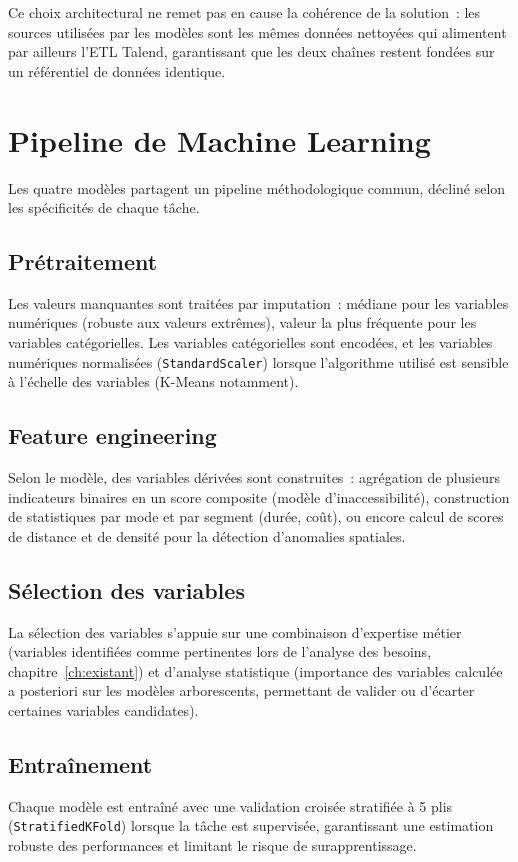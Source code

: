 Ce choix architectural ne remet pas en cause la cohérence de la solution~: les sources utilisées par les modèles sont les mêmes données nettoyées qui alimentent par ailleurs l'ETL Talend, garantissant que les deux chaînes restent fondées sur un référentiel de données identique.

\section{Pipeline de Machine Learning}
Les quatre modèles partagent un pipeline méthodologique commun, décliné selon les spécificités de chaque tâche.

\subsection{Prétraitement}
Les valeurs manquantes sont traitées par imputation~: médiane pour les variables numériques (robuste aux valeurs extrêmes), valeur la plus fréquente pour les variables catégorielles. Les variables catégorielles sont encodées, et les variables numériques normalisées (\texttt{StandardScaler}) lorsque l'algorithme utilisé est sensible à l'échelle des variables (K-Means notamment).

\subsection{Feature engineering}
Selon le modèle, des variables dérivées sont construites~: agrégation de plusieurs indicateurs binaires en un score composite (modèle d'inaccessibilité), construction de statistiques par mode et par segment (durée, coût), ou encore calcul de scores de distance et de densité pour la détection d'anomalies spatiales.

\subsection{Sélection des variables}
La sélection des variables s'appuie sur une combinaison d'expertise métier (variables identifiées comme pertinentes lors de l'analyse des besoins, chapitre~\ref{ch:existant}) et d'analyse statistique (importance des variables calculée a posteriori sur les modèles arborescents, permettant de valider ou d'écarter certaines variables candidates).

\subsection{Entraînement}
Chaque modèle est entraîné avec une validation croisée stratifiée à 5 plis (\texttt{StratifiedKFold}) lorsque la tâche est supervisée, garantissant une estimation robuste des performances et limitant le risque de surapprentissage.

